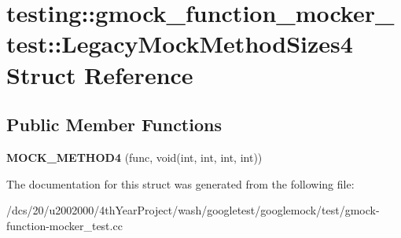 \hypertarget{structtesting_1_1gmock__function__mocker__test_1_1LegacyMockMethodSizes4}{}\section{testing\+:\+:gmock\+\_\+function\+\_\+mocker\+\_\+test\+:\+:Legacy\+Mock\+Method\+Sizes4 Struct Reference}
\label{structtesting_1_1gmock__function__mocker__test_1_1LegacyMockMethodSizes4}
\subsection*{Public Member Functions}
\begin{DoxyCompactItemize}
\item 
\mbox{\label{structtesting_1_1gmock__function__mocker__test_1_1LegacyMockMethodSizes4_a0ebb80311eab78c838fc469d57893916}} 
{\bfseries M\+O\+C\+K\+\_\+\+M\+E\+T\+H\+O\+D4} (func, void(int, int, int, int))
\end{DoxyCompactItemize}


The documentation for this struct was generated from the following file\+:\begin{DoxyCompactItemize}
\item 
/dcs/20/u2002000/4th\+Year\+Project/wash/googletest/googlemock/test/gmock-\/function-\/mocker\+\_\+test.\+cc\end{DoxyCompactItemize}

